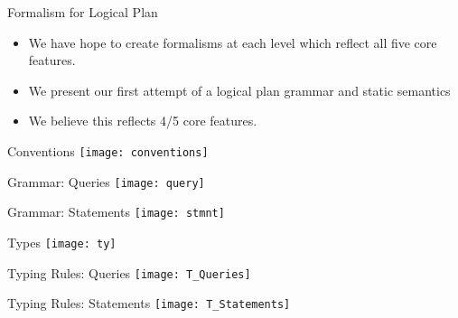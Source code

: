 \begin{frame}{Formalism for Logical Plan}
\begin{itemize}
	\item We have hope to create formalisms at each level which reflect all five
	core features.
	\item We present our first attempt of a logical plan grammar and static
	semantics
	\item We believe this reflects 4/5 core features.
\end{itemize}
\end{frame}

\begin{frame}{Conventions}
\centering
\texttt{[image: conventions]}
\end{frame}

\begin{frame}{Grammar: Queries}
\centering
\texttt{[image: query]}
\end{frame}

\begin{frame}{Grammar: Statements}
\centering
\texttt{[image: stmnt]}
\end{frame}

\begin{frame}{Types}
\centering
\texttt{[image: ty]}
\end{frame}

\begin{frame}{Typing Rules: Queries}
\centering
\texttt{[image: T\_Queries]}
\end{frame}

\begin{frame}{Typing Rules: Statements}
\centering
\texttt{[image: T\_Statements]}
\end{frame}
